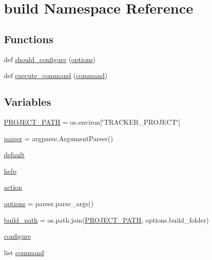 \hypertarget{namespacebuild}{}\section{build Namespace Reference}
\label{namespacebuild}
\subsection*{Functions}
\begin{DoxyCompactItemize}
\item 
def \hyperlink{namespacebuild_afc6e25fefab160d1c99c4d5e6784087b}{should\+\_\+configure} (\hyperlink{namespacebuild_a2c4663bf57d7da0c03ea8c7557117ae6}{options})
\item 
def \hyperlink{namespacebuild_a6d42520f3b959d0c1789754c08ec53c9}{execute\+\_\+command} (\hyperlink{namespacebuild_a42744145588bf3382aa3134b464d378e}{command})
\end{DoxyCompactItemize}
\subsection*{Variables}
\begin{DoxyCompactItemize}
\item 
\hyperlink{namespacebuild_a014c5008d4384fd846c971a8856306dc}{P\+R\+O\+J\+E\+C\+T\+\_\+\+P\+A\+TH} = os.\+environ\mbox{[}\char`\"{}T\+R\+A\+C\+K\+E\+R\+\_\+\+P\+R\+O\+J\+E\+CT\char`\"{}\mbox{]}
\item 
\hyperlink{namespacebuild_a8217a1ff1b7dcad2732a5e359cfbfb31}{parser} = argparse.\+Argument\+Parser()
\item 
\hyperlink{namespacebuild_a66bfdb2cf96ab264fd9961f440b210f7}{default}
\item 
\hyperlink{namespacebuild_a37faf92853bd92811229cdc279a452ee}{help}
\item 
\hyperlink{namespacebuild_add8b407ca543b7e3ec5ed93bc524b251}{action}
\item 
\hyperlink{namespacebuild_a2c4663bf57d7da0c03ea8c7557117ae6}{options} = parser.\+parse\+\_\+args()
\item 
\hyperlink{namespacebuild_a4771056e413a68ffa01e4a3549c8981c}{build\+\_\+path} = os.\+path.\+join(\hyperlink{namespacebuild_a014c5008d4384fd846c971a8856306dc}{P\+R\+O\+J\+E\+C\+T\+\_\+\+P\+A\+TH}, options.\+build\+\_\+folder)
\item 
\hyperlink{namespacebuild_a52581685896d73a5704b29c690a87283}{configure}
\item 
list \hyperlink{namespacebuild_a42744145588bf3382aa3134b464d378e}{command}
\end{DoxyCompactItemize}


